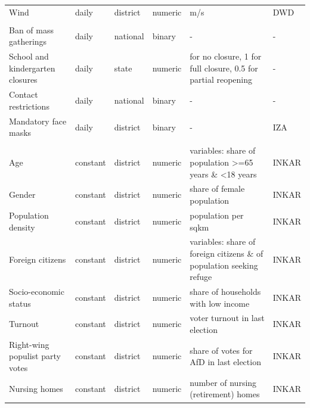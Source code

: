 \documentclass[]{elsarticle} %
\begin{document}
\begin{table}
\begin{tabular}[t]{llll>{\raggedright\arraybackslash}p{10em}l}
\hspace{1em}Wind & daily & district & numeric & m/s & DWD \citep{dwd_weather}\\
\addlinespace[0.3em]
\multicolumn{6}{l}{\textbf{Policies}}\\
\hspace{1em}Ban of mass gatherings & daily & national & binary & - & -\\
\hspace{1em}School and kindergarten closures & daily & state & numeric & 0 for no closure, 1 for full closure, 0.5 for partial reopening & -\\
\hspace{1em}Contact restrictions & daily & national & binary & - & -\\
\hspace{1em}Mandatory face masks & daily & district & binary & - & IZA \citep{mitze2020face}\\
\addlinespace[0.3em]
\multicolumn{6}{l}{\textbf{Socio-demographic}}\\
\hspace{1em}Age & constant & district & numeric & 2 variables: share of population >=65 years \& <18 years & INKAR \citep{inkar}\\
\hspace{1em}Gender & constant & district & numeric & share of female population & INKAR \citep{inkar}\\
\hspace{1em}Population density & constant & district & numeric & population per sqkm & INKAR \citep{inkar}\\
\hspace{1em}Foreign citizens & constant & district & numeric & 2 variables: share of foreign citizens \& of population seeking refuge & INKAR \citep{inkar}\\
\hspace{1em}Socio-economic status & constant & district & numeric & share of households with low income & INKAR \citep{inkar}\\
\hspace{1em}Turnout & constant & district & numeric & voter turnout in last election & INKAR \citep{inkar}\\
\hspace{1em}Right-wing populist party votes & constant & district & numeric & share of votes for AfD in last election & INKAR \citep{inkar}\\
\hspace{1em}Nursing homes & constant & district & numeric & number of nursing (retirement) homes & INKAR \citep{inkar}\\

\end{tabular}
\end{table}
\end{document}
